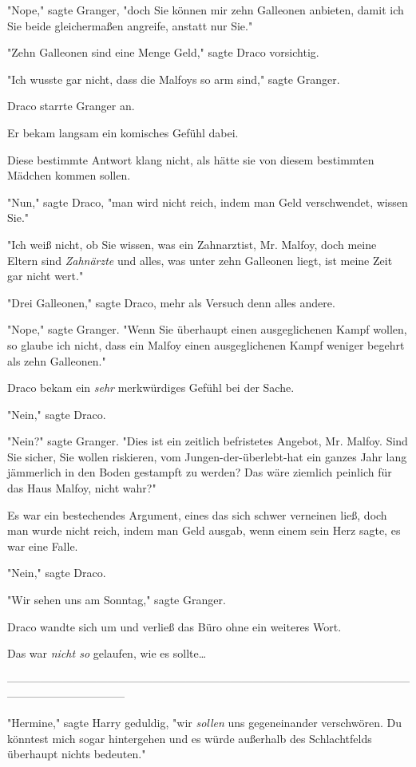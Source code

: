 {"Nope," sagte Granger, "doch Sie können mir zehn Galleonen anbieten, damit ich Sie beide gleichermaßen angreife, anstatt nur Sie."

"Zehn Galleonen sind eine Menge Geld," sagte Draco vorsichtig.

"Ich wusste gar nicht, dass die Malfoys so arm sind," sagte Granger.

Draco starrte Granger an.

Er bekam langsam ein komisches Gefühl dabei.

Diese bestimmte Antwort klang nicht, als hätte sie von diesem bestimmten Mädchen kommen sollen.

"Nun," sagte Draco, "man wird nicht reich, indem man Geld verschwendet, wissen Sie."

"Ich weiß nicht, ob Sie wissen, was ein Zahnarztist, Mr. Malfoy, doch meine Eltern sind \emph{Zahnärzte} und alles, was unter zehn Galleonen liegt, ist meine Zeit gar nicht wert."

"Drei Galleonen," sagte Draco, mehr als Versuch denn alles andere.

"Nope," sagte Granger. "Wenn Sie überhaupt einen ausgeglichenen Kampf wollen, so glaube ich nicht, dass ein Malfoy einen ausgeglichenen Kampf weniger begehrt als zehn Galleonen."

Draco bekam ein \emph{sehr} merkwürdiges Gefühl bei der Sache.

"Nein," sagte Draco.

"Nein?" sagte Granger. "Dies ist ein zeitlich befristetes Angebot, Mr. Malfoy. Sind Sie sicher, Sie wollen riskieren, vom Jungen-der-überlebt-hat ein ganzes Jahr lang jämmerlich in den Boden gestampft zu werden? Das wäre ziemlich peinlich für das Haus Malfoy, nicht wahr?"

Es war ein bestechendes Argument, eines das sich schwer verneinen ließ, doch man wurde nicht reich, indem man Geld ausgab, wenn einem sein Herz sagte, es war eine Falle.

"Nein," sagte Draco.

"Wir sehen uns am Sonntag," sagte Granger.

Draco wandte sich um und verließ das Büro ohne ein weiteres Wort.

Das war \emph{nicht so} gelaufen, wie es sollte…

--------------------------------------------------------------------------------------------------------------------------------------------

"Hermine," sagte Harry geduldig, "wir \emph{sollen} uns gegeneinander verschwören. Du könntest mich sogar hintergehen und es würde außerhalb des Schlachtfelds überhaupt nichts bedeuten."

}
